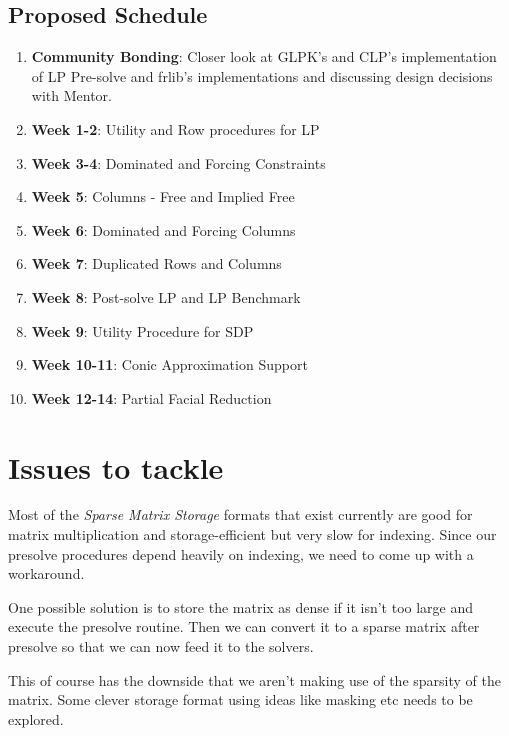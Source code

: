 \documentclass[twoside]{article}
\begin{document}
\begin{multicols}{2}
\subsection{\textbf{Proposed Schedule}}

\begin{enumerate}
	\item[] \textbf{\color{blue}Community Bonding}: Closer look at GLPK's and CLP's implementation of LP Pre-solve and frlib's implementations and discussing design decisions with Mentor. 
    \item[] \textbf{\color{blue}Week 1-2}: Utility and Row procedures for LP
    \item[] \textbf{\color{blue}Week 3-4}: Dominated and Forcing Constraints  
    \item[] \textbf{\color{blue}Week 5}: Columns - Free and Implied Free 
    \item[] \textbf{\color{blue}Week 6}: Dominated and Forcing Columns
    \item[] \textbf{\color{blue}Week 7}: Duplicated Rows and Columns
    \item[] \textbf{\color{blue}Week 8}: Post-solve LP and LP Benchmark 
    \item[] \textbf{\color{blue}Week 9}: Utility Procedure for SDP  
    \item[] \textbf{\color{blue}Week 10-11}: Conic Approximation Support 
    \item[] \textbf{\color{blue}Week 12-14}: Partial Facial Reduction 
\end{enumerate}
\vspace*{-\baselineskip}

\section{\textbf{Issues to tackle}}

Most of the \textit{Sparse Matrix Storage} formats that exist currently are good for matrix multiplication and storage-efficient but very slow for indexing. Since our presolve procedures depend heavily on indexing, we need to come up with a workaround. 

One possible solution is to store the matrix as dense if it isn't too large and execute the presolve routine. Then we can convert it to a sparse matrix after presolve so that we can now feed it to the solvers. 

This of course has the downside that we aren't making use of the sparsity of the matrix. Some clever storage format using ideas like masking etc needs to be explored. 


\end{multicols}
\end{document}
